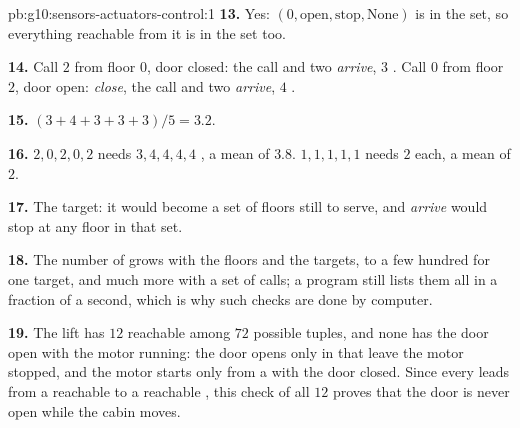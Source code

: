 \begin{solution}{pb:g10:sensors-actuators-control:1}
\textbf{13.} Yes: $(0, \text{open}, \text{stop}, \text{None})$ is in the set, so everything reachable from it is in
the set too.

\textbf{14.} Call $2$ from floor $0$, door closed: the call and two \textit{arrive}, $3$ . Call $0$ from floor
$2$, door open: \textit{close}, the call and two \textit{arrive}, $4$ .

\textbf{15.} $(3 + 4 + 3 + 3 + 3)/5 = 3.2$.

\textbf{16.} $2, 0, 2, 0, 2$ needs $3, 4, 4, 4, 4$ , a mean of $3.8$. $1, 1, 1, 1, 1$ needs $2$ each, a mean
of $2$.

\textbf{17.} The target: it would become a set of floors still to serve, and \textit{arrive} would stop at any floor
in that set.

\textbf{18.} The number of  grows with the floors and the targets, to a few hundred for one target, and much
more with a set of calls; a program still lists them all in a fraction of a second, which is why such checks are
done by computer.

\textbf{19.} The lift has $12$ reachable  among $72$ possible tuples, and none has the door open with the motor
running: the door opens only in  that leave the motor stopped, and the motor starts only from a 
with the door closed. Since every  leads from a reachable  to a reachable , this check of all $12$
proves that the door is never open while the cabin moves.
\end{solution}
